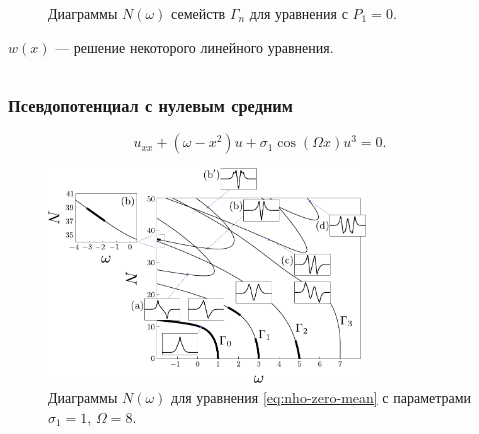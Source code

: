 \documentclass [10pt] {beamer}
\begin{document}
\begin{frame}
\begin{columns}[T]
\begin{column}{.5\textwidth}
\begin{figure}[h]
			\caption{Диаграммы $N(\omega)$ семейств $\Gamma_n$ для уравнения с $P_1 = 0$.}
			\end{figure}
			$w(x)$ --- решение некоторого линейного уравнения.
		\end{column}
	\end{columns}
\end{frame}

\begin{frame}
	\frametitle{Псевдопотенциал с нулевым средним}
	
	\begin{equation}
		u_{xx} + (\omega - x^2) u + \sigma_1 \cos (\Omega x) u^3 = 0.
	\label{eq:nho-zero-mean}
	\end{equation}
	
	\begin{figure}[h]
	\includegraphics[width = 0.75\textwidth]{pic/branches for cosine nho, zero mean}
	\caption{
		Диаграммы $N(\omega)$ для уравнения \eqref{eq:nho-zero-mean} с параметрами $\sigma_1 = 1$, $\Omega = 8$.
	}
	\end{figure}
\end{frame}
\end{document}
